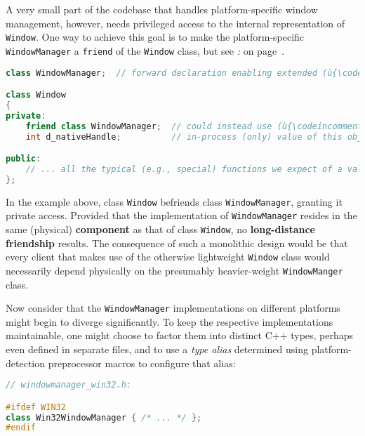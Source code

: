 A very small part of the codebase that handles platform-specific window
management, however, needs privileged access to the internal
representation of \texttt{Window}. One way to achieve this goal is to
make the platform-specific \texttt{WindowManager} a \texttt{friend} of
the \texttt{Window} class, but see \textit{: } on page~\pageref{long-distance-friendship}.

\begin{lstlisting}[language=C++]
class WindowManager;  // forward declaration enabling extended (ù{\codeincomments{friend}}ù) syntax

class Window
{
private:
    friend class WindowManager;  // could instead use (ù{\codeincomments{friend WindowManager;}}ù)
    int d_nativeHandle;          // in-process (only) value of this object

public:
    // ... all the typical (e.g., special) functions we expect of a value type
};
\end{lstlisting}

\noindent In the example above, class \texttt{Window} befriends class
\texttt{WindowManager}, granting it private access. Provided that the
implementation of \texttt{WindowManager} resides in the same (physical)
\textbf{component} as that of class \texttt{Window}, no
\textbf{long-distance friendship} results. The consequence of such a
monolithic design would be that every client that makes use of the
otherwise lightweight \texttt{Window} class would necessarily depend
physically on the presumably heavier-weight \texttt{WindowManger} class.

Now consider that the \texttt{WindowManager} implementations on
different platforms might begin to diverge significantly. To keep the
respective implementations maintainable, one might choose to factor them
into distinct C++ types, perhaps even defined in separate files, and to
use a \emph{type alias} determined using platform-detection preprocessor
macros to configure that alias:


\begin{lstlisting}[language=C++]
// windowmanager_win32.h:

#ifdef WIN32
class Win32WindowManager { /* ... */ };
#endif
\end{lstlisting}

\vspace*{2ex}


